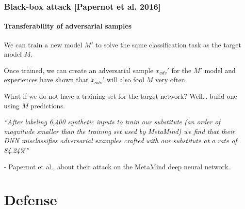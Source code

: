 \documentclass[9pt]{beamer}
\begin{document}
\begin{frame}
  \frametitle{Black-box attack [Papernot et al. 2016]}

  \framesubtitle{Transferability of adversarial samples}


  We can train a new model $M'$ to solve the same classification task
  as the target model $M$.

  \pause

  \bigskip

  Once trained, we can create an adversarial sample $x_{adv}'$ for the
  $M'$ model and experiences have shown that $x_{adv}'$ will also fool
  $M$ very often.

  \pause

  \bigskip

  What if we do not have a training set for the target network?
  Well\dots{} build one using $M$ predictions.

  \pause

  \bigskip

  \textit{``After labeling 6,400 synthetic inputs to train our
    substitute (an order of magnitude smaller than the training set
    used by MetaMind) we find that their DNN misclassifies adversarial
    examples crafted with our substitute at a rate of 84.24\%''}

  \smallskip

  - Papernot et al., about their attack on the MetaMind deep neural
  network.

\end{frame}


\section{Defense}


\end{document}
